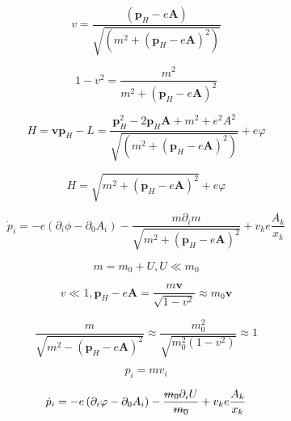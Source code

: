 \begin{solution}
\begin{solution}
	$$
	v = \frac{\left(\boldsymbol{p}_H-e\boldsymbol{A}\right)}{\sqrt{\left(m^2 + \left(\boldsymbol{p}_H-e\boldsymbol{A}\right)^2\right)}}
	$$
	
	
	
	$$	
	1- v^2 = \frac{m^2}{m^2 + \left(\boldsymbol{p}_H-e\boldsymbol{A}\right)^2}
	$$
	
	$$
	H = \boldsymbol{v}\boldsymbol{p}_H - L = \frac{\boldsymbol{p}^2_H - 2 \boldsymbol{p}_H \boldsymbol{A} + m^2  + e^2 A^2 }{\sqrt{\left(m^2 + \left(\boldsymbol{p}_H-e\boldsymbol{A}\right)^2\right)}} + e \varphi
	$$
	
	$$
	H= \sqrt{m^2 + \left(\boldsymbol{p}_H - e \boldsymbol{A}\right)^2} + e \varphi
	$$
	
	$$
	\dot{p}_i = - e \left( \partial_i \phi - \partial_0 A_i \right) - \frac{m \partial_i m}{\sqrt{m^2 + \left(\boldsymbol{p}_H - e \boldsymbol{A}\right)^2}} + v_k e \frac{A_k}{x_k}
	$$
	
	
	$$
	m = m_0 + U , U \ll m_0
	$$
	
	
	$$
	v \ll 1 ,  \boldsymbol{p}_H  - e \boldsymbol{A} = \frac{ m \boldsymbol{v}}{\sqrt{1-v^2}}\approx m_0 \boldsymbol{v}
	$$
	
	
	$$
	\frac{m}{\sqrt{m^2 - \left(\boldsymbol{p}_H - e\boldsymbol{A}\right)^2}}\approx \frac{m_{0}^2}{\sqrt{m_{0}^2\left(1-v^2\right)}}\approx 1
	$$
	
	
	$$
	p_i = m v_i
	$$
	
	$$
	\dot{p}_i = - e \left(\partial_i \varphi  - \partial_0 A_i\right) - \frac{\stkout{m_0} \partial_i U}{\stkout{m_0}} + v_k e \frac{A_k}{x_k}
	$$
	\end{solution}


\end{solution}



	
